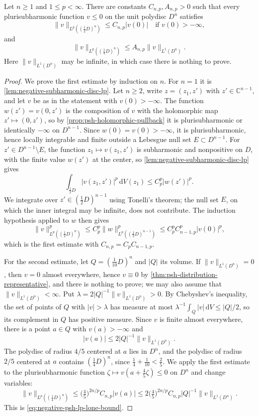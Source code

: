 \begin{proposition}\label{prop:negative-psh-polydisc-lp}
Let $n\geq1$ and $1\leq p<\infty$. There are constants $C_{n,p},A_{n,p}>0$ such that every plurisubharmonic function $v\leq0$ on the unit polydisc $D^n$ satisfies
\[
 \|v\|_{L^p((\tfrac12D)^n)}\leq C_{n,p}|v(0)|
                         \quad\text{if }v(0)>-\infty,
\]
and
\begin{equation}\label{eq:negative-psh-lp-lone-bound}
 \|v\|_{L^p((\tfrac14D)^n)}\leq A_{n,p}\|v\|_{L^1(D^n)}.
\end{equation}
Here $\|v\|_{L^1(D^n)}$ may be infinite, in which case there is nothing to prove.
\end{proposition}
\begin{proof}
We prove the first estimate by induction on $n$. For $n=1$ it is \cref{lem:negative-subharmonic-disc-lp}. Let $n\geq2$, write $z=(z_1,z')$ with $z'\in\mathbb C^{n-1}$, and let $v$ be as in the statement with $v(0)>-\infty$. The function $w(z')=v(0,z')$ is the composition of $v$ with the holomorphic map $z'\mapsto(0,z')$, so by \cref{prop:psh-holomorphic-pullback} it is plurisubharmonic or identically $-\infty$ on $D^{n-1}$. Since $w(0)=v(0)>-\infty$, it is plurisubharmonic, hence locally integrable and finite outside a Lebesgue null set $E\subset D^{n-1}$. For $z'\in D^{n-1}\setminus E$, the function $z_1\mapsto v(z_1,z')$ is subharmonic and nonpositive on $D$, with the finite value $w(z')$ at the center, so \cref{lem:negative-subharmonic-disc-lp} gives
\[
 \int_{\frac12D}|v(z_1,z')|^p\,\mathrm dV(z_1)
                              \leq C_p^p|w(z')|^p.
\]
We integrate over $z'\in(\tfrac12D)^{n-1}$ using Tonelli's theorem; the null set $E$, on which the inner integral may be infinite, does not contribute. The induction hypothesis applied to $w$ then gives
\[
 \|v\|_{L^p((\frac12D)^n)}^p\leq C_p^p\|w\|_{L^p((\frac12D)^{n-1})}^p\leq C_p^pC_{n-1,p}^p|v(0)|^p,
\]
which is the first estimate with $C_{n,p}=C_pC_{n-1,p}$.

For the second estimate, let $Q=(\tfrac1{10}D)^n$ and $|Q|$ its volume. If $\|v\|_{L^1(D^n)}=0$, then $v=0$ almost everywhere, hence $v\equiv0$ by \cref{thm:psh-distribution-representative}, and there is nothing to prove; we may also assume that $\|v\|_{L^1(D^n)}<\infty$. Put $\lambda=2|Q|^{-1}\|v\|_{L^1(D^n)}>0$. By Chebyshev's inequality, the set of points of $Q$ with $|v|>\lambda$ has measure at most $\lambda^{-1}\int_Q|v|\,\mathrm dV\leq|Q|/2$, so its complement in $Q$ has positive measure. Since $v$ is finite almost everywhere, there is a point $a\in Q$ with $v(a)>-\infty$ and
\[
 |v(a)|\leq2|Q|^{-1}\|v\|_{L^1(D^n)}.
\]
The polydisc of radius $4/5$ centered at $a$ lies in $D^n$, and the polydisc of radius $2/5$ centered at $a$ contains $(\tfrac14D)^n$, since $\tfrac14+\tfrac1{10}<\tfrac25$. We apply the first estimate to the plurisubharmonic function $\zeta\mapsto v(a+\tfrac45\zeta)\leq0$ on $D^n$ and change variables:
\[
 \|v\|_{L^p((\frac14D)^n)}\leq\bigl(\tfrac45\bigr)^{2n/p}C_{n,p}|v(a)|\leq2\bigl(\tfrac45\bigr)^{2n/p}C_{n,p}|Q|^{-1}\|v\|_{L^1(D^n)}.
\]
This is \eqref{eq:negative-psh-lp-lone-bound}.
\end{proof}

